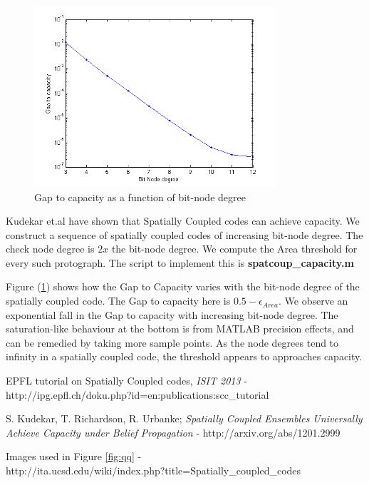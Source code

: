 \documentclass[paper=a4, fontsize=12pt]{scrartcl} %
\numberwithin{equation}{section} %
\numberwithin{figure}{section} %
\numberwithin{table}{section} %
\begin{document}
\begin{figure}
\centering
\includegraphics[width=0.8\textwidth]{images/capacity}
\caption{Gap to capacity as a function of bit-node degree}
\label{capacity}
\end{figure}

Kudekar et.al \cite{Capacity} have shown that Spatially Coupled codes can achieve capacity. We construct a sequence of spatially coupled codes of increasing bit-node degree. The check node degree is $2x$ the bit-node degree. We compute the Area threshold for every such protograph. The script to implement this is \textbf{spatcoup\_capacity.m}

Figure (\ref{capacity}) shows how the Gap to Capacity varies with the bit-node degree of the spatially coupled code. The Gap to capacity here is $0.5-\epsilon_{Area}$. We observe an exponential fall in the Gap to capacity with increasing bit-node degree. The saturation-like behaviour at the bottom is from MATLAB precision effects, and can be remedied by taking more sample points. As the node degrees tend to infinity in a spatially coupled code, the threshold appears to approaches capacity. 


\begin{thebibliography}{300}
EPFL tutorial on Spatially Coupled codes, \textit{ISIT 2013} - \\
http://ipg.epfl.ch/doku.php?id=en:publications:scc\_tutorial

S. Kudekar, T. Richardson, R. Urbanke; \textit{Spatially Coupled Ensembles Universally Achieve Capacity under Belief Propagation} - http://arxiv.org/abs/1201.2999

Images used in Figure \ref{fig:qq} - \\
http://ita.ucsd.edu/wiki/index.php?title=Spatially\_coupled\_codes

\end{thebibliography}
\end{document}
